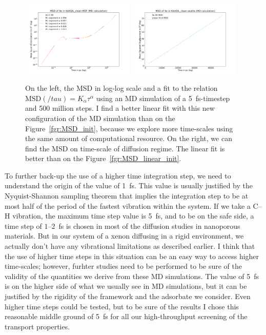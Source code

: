 \documentclass[main]{subfiles}
\begin{document}
\begin{figure}[ht]
  \centering
  \includegraphics[width=0.48\textwidth]{figures/5-diffusion/MSD_Xe_KAXQIL_clean_5fs.pdf}
  \includegraphics[width=0.48\textwidth]{figures/5-diffusion/MSD_Xe_coeff_KAXQIL_clean_5fs.pdf}
\caption{ On the left, the MSD in log-log scale and a fit to the relation $\text{MSD}(/tau) = K_\alpha\tau^\alpha$ using an MD simulation of a \SI{5}{\fs}-timestep and 500 million steps. I find a better linear fit with this new configuration of the MD simulation than on the Figure~\ref{fgr:MSD_init}, because we explore more time-scales using the same amount of computational resource. On the right, we can find the MSD on time-scale of diffusion regime. The linear fit is better than on the Figure~\ref{fgr:MSD_linear_init}.}\label{fgr:MSD_5fs}
\end{figure}

To further back-up the use of a higher time integration step, we need to understand the origin of the value of \SI{1}{\fs}. This value is usually justified by the Nyquist-Shannon sampling theorem that implies the integration step to be at most half of the period of the fastest vibration within the system. If we take a C--H vibration, the maximum time step value is \SI{5}{\fs}, and to be on the safe side, a time step of $1$--$2$~\si{\fs} is chosen in most of the diffusion studies in nanoporous materials.\autocite{Bukowski_2021} But in our system of a xenon diffusing in a rigid environment, we actually don't have any vibrational limitations as described earlier. I think that the use of higher time steps in this situation can be an easy way to access higher time-scales; however, furhter studies need to be performed to be sure of the validity of the quantities we derive from these MD simulations. The value of \SI{5}{\fs} is on the higher side of what we usually see in MD simulations, but it can be justified by the rigidity of the framework and the adsorbate we consider. Even higher time steps could be tested, but to be sure of the results I chose this reasonable middle ground of \SI{5}{\fs} for all our high-throughput screening of the transport properties.
\end{document}
